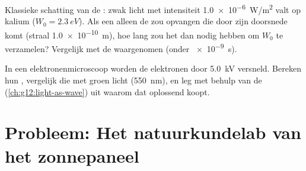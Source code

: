 \begin{exercise}[$\star\star\star$]\label{exo:g12:quantum-world:14}
Klassieke schatting van de : zwak licht met intensiteit
\qty{1.0e-6}{W/m^2} valt op kalium ($W_0 = \qty{2.3}{eV}$). Als een 
alleen de  zou opvangen die door zijn doorsnede komt (straal
\qty{1.0e-10}{m}), hoe lang zou het dan nodig hebben om $W_0$ te verzamelen?
Vergelijk met de waargenomen  (onder \qty{e-9}{s}).
\end{exercise}

\begin{exercise}[$\star\star\star$]\label{exo:g12:quantum-world:15}
In een elektronenmicroscoop worden de elektronen door \qty{5.0}{kV} versneld.
Bereken hun , vergelijk die met groen licht
(\qty{550}{nm}), en leg met behulp van de 
(\cref{ch:g12:light-as-wave}) uit waarom dat oplossend  koopt.
\end{exercise}

\section{Probleem: Het natuurkundelab van het zonnepaneel}

